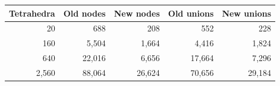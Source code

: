 \begin{tabular}{rrrrr}
\toprule
Tetrahedra & Old nodes & New nodes & Old unions & New unions \\
\midrule
20 & 688 & 208 & 552 & 228 \\
160 & 5,504 & 1,664 & 4,416 & 1,824 \\
640 & 22,016 & 6,656 & 17,664 & 7,296 \\
2,560 & 88,064 & 26,624 & 70,656 & 29,184 \\
\bottomrule
\end{tabular}
